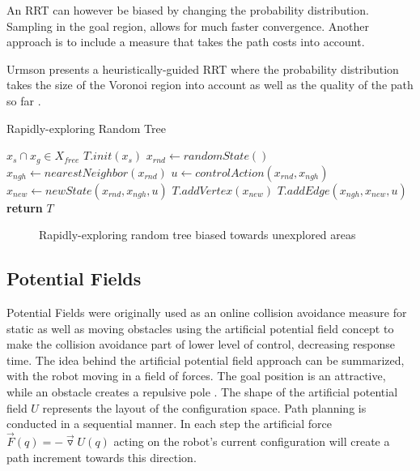 An RRT can however be biased by changing the probability distribution. Sampling in the goal region, allows for much faster convergence. Another approach is to include a measure that takes the path costs into account. \cite{Lavalle.1999}

Urmson presents a heuristically-guided RRT where the probability distribution takes the size of the Voronoi region into account as well as the quality of the path so far \cite{Urmson.2003}.

\begin{algorithm}
    \caption{Rapidly-exploring Random Tree}\label{alg:RRT}
    \begin{algorithmic}[1]
        \Require $x_s \cap x_g \in X_{free}$
        \State $T.init(x_s)$
            \State $x_{rnd} \gets randomState()$ \label{alg:RRTrandomState}
            \State $x_{ngh} \gets nearestNeighbor(x_{rnd})$ \label{alg:RRTnearestNeighbor}
            \State $u \gets controlAction(x_{rnd}, x_{ngh})$ \label{alg:RRTcontrolAction}
            \State $x_{new} \gets newState(x_{rnd}, x_{ngh}, u)$ \label{alg:RRTnewState}
            \State $T.addVertex(x_{new})$ \label{alg:RRTaddVertex}
            \State $T.addEdge(x_{ngh}, x_{new}, u)$ \label{alg:RRTaddEdge}
        \EndWhile
        \State \textbf{return} $T$
    \end{algorithmic}
\end{algorithm}

\begin{figure}[h]
    \caption{Rapidly-exploring random tree biased towards unexplored areas}
    \label{fig:RRT}
\end{figure}

\subsection{Potential Fields}
Potential Fields were originally used as an online collision avoidance measure for static as well as moving obstacles using the artificial potential field concept to make the collision avoidance part of lower level of control, decreasing response time. The idea behind the artificial potential field approach can be summarized, with the robot moving in a field of forces. The goal position is an attractive, while an obstacle creates a repulsive pole \cite{Khatib.1986}. The shape of the artificial potential field $U$ represents the layout of the configuration space. Path planning is conducted in a sequential manner. In each step the artificial force $\vec{F}(q) = -\vec{\triangledown}U(q)$ acting on the robot's current configuration will create a path increment towards this direction. \cite{Latombe.1991}

